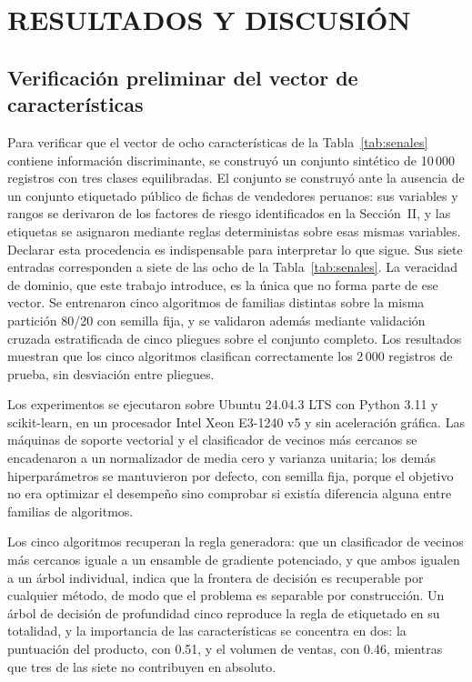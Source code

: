 
\section{RESULTADOS Y DISCUSIÓN}

\subsection{Verificación preliminar del vector de características}

Para verificar que el vector de ocho características de la Tabla~\ref{tab:senales} contiene
información discriminante, se construyó un conjunto sintético de 10\,000 registros con tres
clases equilibradas. El conjunto se construyó ante la ausencia de un conjunto etiquetado
público de fichas de vendedores peruanos: sus variables y rangos se derivaron de los factores
de riesgo identificados en la Sección~II, y las etiquetas se asignaron mediante reglas
deterministas sobre esas mismas variables. Declarar esta procedencia es indispensable para
interpretar lo que sigue. Sus siete entradas corresponden a siete de las ocho de la
Tabla~\ref{tab:senales}. La veracidad de dominio, que este trabajo introduce, es la única que
no forma parte de ese vector. Se entrenaron cinco algoritmos de familias distintas sobre la
misma partición 80/20 con semilla fija, y se validaron además mediante validación cruzada
estratificada de cinco pliegues sobre el conjunto completo. Los resultados muestran que los
cinco algoritmos clasifican correctamente los 2\,000 registros de prueba, sin desviación
entre pliegues.

Los experimentos se ejecutaron sobre Ubuntu 24.04.3 LTS con Python 3.11 y scikit-learn, en un
procesador Intel Xeon E3-1240 v5 y sin aceleración gráfica. Las máquinas de soporte vectorial y
el clasificador de vecinos más cercanos se encadenaron a un normalizador de media cero y
varianza unitaria; los demás hiperparámetros se mantuvieron por defecto, con semilla fija,
porque el objetivo no era optimizar el desempeño sino comprobar si existía diferencia alguna
entre familias de algoritmos.

Los cinco algoritmos recuperan la regla generadora: que un clasificador de vecinos más
cercanos iguale a un ensamble de gradiente potenciado, y que ambos igualen a un árbol
individual, indica que la frontera de decisión es recuperable por cualquier método, de modo
que el problema es separable por construcción. Un árbol de decisión de profundidad cinco
reproduce la regla de etiquetado en su totalidad, y la importancia de las características se
concentra en dos: la puntuación del producto, con 0.51, y el volumen de ventas, con 0.46,
mientras que tres de las siete no contribuyen en absoluto.


